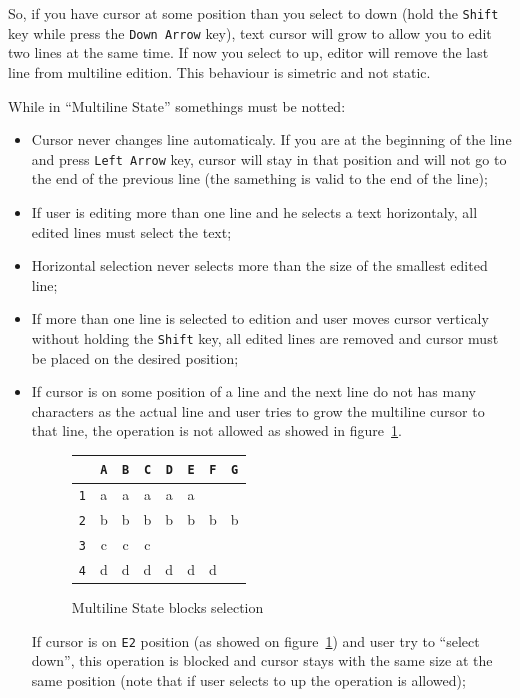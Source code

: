 \documentclass[11pt,a4paper]{report}
\begin{document}
So, if you have cursor at some position than you select to down (hold the \texttt{Shift} key while press the \texttt{Down Arrow} key), text cursor will grow to allow you to edit two lines at the same time. If now you select to up, editor will remove the last line from multiline edition. This behaviour is simetric and not static.

While in ``Multiline State'' somethings must be notted:

\begin{itemize}
\item Cursor never changes line automaticaly. If you are at the beginning of the line and press \texttt{Left Arrow} key, cursor will stay in that position and will not go to the end of the previous line (the samething is valid to the end of the line);

\item If user is editing more than one line and he selects a text horizontaly, all edited lines must select the text;

\item Horizontal selection never selects more than the size of the smallest edited line;

\item If more than one line is selected to edition and user moves cursor verticaly without holding the \texttt{Shift} key, all edited lines are removed and cursor must be placed on the desired position;

\item If cursor is on some position of a line and the next line do not has many characters as the actual line and user tries to grow the multiline cursor to that line, the operation is not allowed as showed in figure~\ref{multilineBlockExample}.

\begin{figure}[hbt]
\centering
\begin{tabular}{|c|ccccccc|}
\hline
 & \verb'A' & \verb'B' & \verb'C' & \verb'D' & \verb'E' & \verb'F' & \verb'G' \\ 
\hline
\verb'1' & a & a & a & a & a &   &  \\ 
\verb'2' & b & b & b & b &\vline b & b & b \\ 
\verb'3' & c & c & c &   &   &   &   \\ 
\verb'4' & d & d & d & d & d & d &   \\
\hline
\end{tabular}
\caption{Multiline State blocks selection} \label{multilineBlockExample}
\end{figure}

If cursor is on \texttt{E2} position (as showed on figure~\ref{multilineBlockExample}) and user try to ``select down'', this operation is blocked and cursor stays with the same size at the same position (note that if user selects to up the operation is allowed);

\end{itemize}
\end{document}
